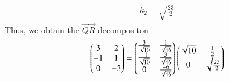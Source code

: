 \begin{enumerate}[label=\thesection.\arabic*.,ref=\thesection.\theenumi]
\begin{align}
\\
k_2 = \sqrt{\frac{23}{2}}
\end{align}
Thus, we obtain the $\vec{Q}\vec{R}$ decompositon
\begin{align}
\begin{pmatrix}
3 & 2
\\
-1 & 1
\\
0 & -3
\end{pmatrix}
=\begin{pmatrix}
\frac{3}{\sqrt{10}} & \frac{1}{\sqrt{46}}
\\
\frac{-1}{\sqrt{10}} & \frac{3}{\sqrt{46}}
\\
0 & \frac{-6}{\sqrt{46}}
\end{pmatrix}
\begin{pmatrix}
\sqrt{10}& \frac{1}{2}
\\
0&\sqrt{\frac{23}{2}}
\end{pmatrix}
\end{align}

\end{enumerate}
